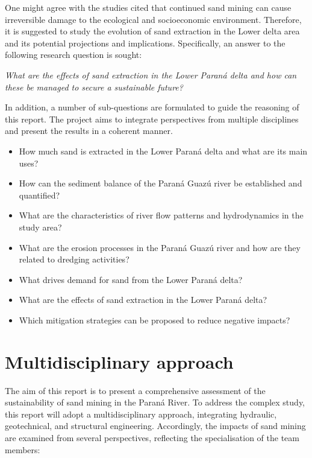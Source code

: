 One might agree with the studies cited that continued sand mining can cause irreversible damage to the ecological and socioeconomic environment. Therefore, it is suggested to study the evolution of sand extraction in the Lower delta area and its potential projections and implications. Specifically, an answer to the following research question is sought:

\textit{What are the effects of sand extraction in the Lower Paraná delta and how can these be managed to secure a sustainable future?}

In addition, a number of sub-questions are formulated to guide the reasoning of this report. The project aims to integrate perspectives from multiple disciplines and present the results in a coherent manner.

\begin{itemize} 
    \item How much sand is extracted in the Lower Paraná delta and what are its main uses?
    \item How can the sediment balance of the Paraná Guazú river be established and quantified?
    \item What are the characteristics of river flow patterns and hydrodynamics in the study area?
    \item What are the erosion processes in the Paraná Guazú river and how are they related to dredging activities?
    \item What drives demand for sand from the Lower Paraná delta?
    \item What are the effects of sand extraction in the Lower Paraná delta?
    \item Which mitigation strategies can be proposed to reduce negative impacts?
\end{itemize}

\section{Multidisciplinary approach}
The aim of this report is to present a comprehensive assessment of the sustainability of sand mining in the Paraná River.
To address the complex study, this report will adopt a multidisciplinary approach, integrating hydraulic, geotechnical, and structural engineering.
Accordingly, the impacts of sand mining are examined from several perspectives, reflecting the specialisation of the team members:

